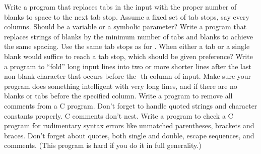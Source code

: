 \begin{ExerciseList}
\Exercise Write a program  that replaces tabs in the input with the proper number of blanks to space to the next tab stop. Assume a fixed set of tab stops, say every  columns. Should  be a variable or a symbolic parameter?
\Exercise Write a program  that replaces strings of blanks by the minimum number of tabs and blanks to achieve the same spacing. Use the same tab stops as for . When either a tab or a single blank would suffice to reach a tab stop, which should be given preference?
\Exercise Write a program to ``fold'' long input lines into two or more shorter lines after the last non-blank character that occurs before the -th column of input. Make sure your program does something intelligent with very long lines, and if there are no blanks or tabs before the specified column.
\Exercise Write a program to remove all comments from a C program. Don't forget to handle quoted strings and character constants properly. C comments don't nest.
\Exercise Write a program to check a C program for rudimentary syntax errors like unmatched parentheses, brackets and braces. Don't forget about quotes, both single and double, escape sequences, and comments. (This program is hard if you do it in full generality.)
\end{ExerciseList}


